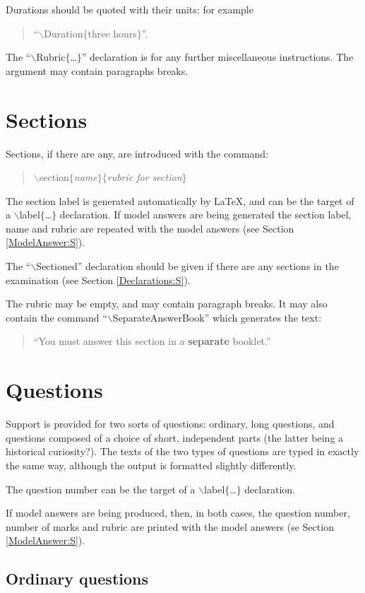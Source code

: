 \documentclass[12pt,twoside]{article}
\newcommand{\kwd}[1]{\textsf{#1}}
\newcommand{\cmd}[1]{$\backslash$\textsf{#1}}
\newcommand{\tcmd}[3]{\cmd{#1}$\{$#3{#2}$\}$}
\newcommand{\dcmd}[2]{\tcmd{#1}{#2}{\emph}}
\newcommand{\pcmd}[2]{\tcmd{#1}{#2}{\kwd}}
\begin{document}
Durations should be quoted with their units: for example
\begin{quote}
``\pcmd{Duration}{three hours}''.
\end{quote}

The ``\pcmd{Rubric}{\ldots}'' declaration is for any further
miscellaneous instructions.  The argument may contain paragraphs
breaks.

\section{Sections}\label{Section:S}

Sections, if there are any, are introduced with the command:
\begin{quote}
        \dcmd{section}{name}$\{$\emph{rubric for section}$\}$
\end{quote}
The section label is generated automatically by \LaTeX, and can be the
target of a \pcmd{label}{\ldots} declaration.  If model answers are
being generated the section label, name and rubric are repeated with
the model answers (see Section \ref{ModelAnswer:S}).

The ``\cmd{Sectioned}'' declaration should be given if there are any
sections in the examination (see Section \ref{Declarations:S}).

The rubric may be empty, and may contain paragraph breaks.  It may
also contain the command ``\cmd{SeparateAnswerBook}'' which generates
the text:
\begin{quote}
        ``You must answer this section in a \textbf{separate} booklet.''
\end{quote}

\section{Questions}
Support is provided for two sorts of questions: ordinary, long
questions, and questions composed of a choice of short, independent
parts (the latter being a historical curiosity?).  The texts of the
two types of questions are typed in exactly the same way, although the
output is formatted slightly differently.

The question number can be the target of a \pcmd{label}{\ldots}
declaration.

If model answers are being produced, then, in both cases, the question
number, number of marks and rubric are printed with the model answers
(se Section \ref{ModelAnswer:S}).

\subsection{Ordinary questions}
\end{document}
